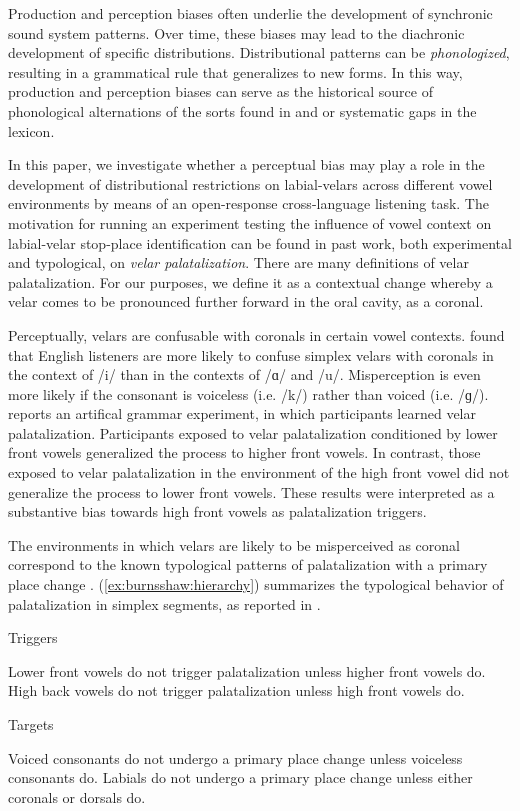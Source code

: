 \documentclass[output=paper,colorlinks,citecolor=brown
]{langscibook}
\begin{document}
Production and perception biases often underlie the development of synchronic sound system patterns. Over time, these biases may lead to the diachronic development of specific distributions. Distributional patterns can be \textit{phonologized}, resulting in a grammatical rule that generalizes to new forms. In this way, production and perception biases can serve as the historical source of phonological alternations of the sorts found in  and  or systematic gaps in the lexicon.

In this paper, we investigate whether a perceptual bias may play a role in the development of distributional restrictions on labial-velars across different vowel environments by means of an open-response cross-language listening task. The motivation for running an experiment testing the influence of vowel context on labial-velar stop-place identification can be found in past work, both experimental and typological, on \textit{velar palatalization}. There are many definitions of velar palatalization. For our purposes, we define it as a contextual change whereby a velar comes to be pronounced further forward in the oral cavity, as a coronal.

Perceptually, velars are confusable with coronals in certain vowel contexts. \citet{Guion1998} found that English listeners are more likely to confuse simplex velars with coronals in the context of /i/ than in the contexts of /ɑ/ and /u/. Misperception is even more likely if the consonant is voiceless (i.e. /k/) rather than voiced (i.e. /ɡ/). \citet{Wilson2006} reports an artifical grammar experiment, in which participants learned velar palatalization. Participants exposed to velar palatalization conditioned by lower front vowels generalized the process to higher front vowels. In contrast, those exposed to velar palatalization in the environment of the high front vowel did not generalize the process to lower front vowels. These results were interpreted as a substantive bias towards high front vowels as palatalization triggers.

The environments in which velars are likely to be misperceived as coronal correspond to the known typological patterns of palatalization with a primary place change \citep{Bhat1978, Bateman2007}. (\ref{ex:burnsshaw:hierarchy}) summarizes the typological behavior of palatalization in simplex segments, as reported in \citet{Bateman2007}.

\ea\label{ex:burnsshaw:hierarchy}
\begin{xlist}
\ex Triggers
    \begin{xlist}
	\ex Lower front vowels do not trigger palatalization unless higher front vowels do.
	\ex High back vowels do not trigger palatalization unless high front vowels do.
    \end{xlist}
\ex Targets
    \begin{xlist}
    \ex Voiced consonants do not undergo a primary place change unless voiceless consonants do.
	\ex Labials do not undergo a primary place change unless either coronals or dorsals do.
    \end{xlist}
 \end{xlist}
\z
\end{document}
